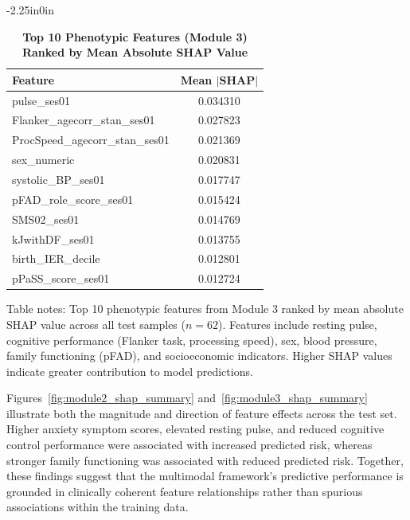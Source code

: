 \documentclass[10pt,letterpaper]{article}
\newcommand{\hlpar}[1]{\leavevmode\colorbox{yellow!30}{\parbox{\dimexpr\linewidth-2\fboxsep\relax}{#1}}\vspace{2pt}}
\begin{document}
\begin{table}[!t]
\begin{adjustwidth}{-2.25in}{0in}
\centering
\caption{\textbf{Top 10 Phenotypic Features (Module 3) Ranked by Mean Absolute SHAP Value}}
\label{tab:module3_shap}
\footnotesize
\renewcommand{\arraystretch}{1.3}

\begin{tabular}{|l|c|}
\hline
\textbf{Feature} & \textbf{Mean $|$SHAP$|$} \\
\hline
pulse\_ses01 & 0.034310 \\
\hline
Flanker\_agecorr\_stan\_ses01 & 0.027823 \\
\hline
ProcSpeed\_agecorr\_stan\_ses01 & 0.021369 \\
\hline
sex\_numeric & 0.020831 \\
\hline
systolic\_BP\_ses01 & 0.017747 \\
\hline
pFAD\_role\_score\_ses01 & 0.015424 \\
\hline
SMS02\_ses01 & 0.014769 \\
\hline
kJwithDF\_ses01 & 0.013755 \\
\hline
birth\_IER\_decile & 0.012801 \\
\hline
pPaSS\_score\_ses01 & 0.012724 \\
\hline
\end{tabular}

\begin{flushleft}
Table notes: Top 10 phenotypic features from Module 3 ranked by mean absolute SHAP value across all test samples ($n=62$). Features include resting pulse, cognitive performance (Flanker task, processing speed), sex, blood pressure, family functioning (pFAD), and socioeconomic indicators. Higher SHAP values indicate greater contribution to model predictions.
\end{flushleft}
\end{adjustwidth}
\end{table}

\hlpar{Figures~\ref{fig:module2_shap_summary} and~\ref{fig:module3_shap_summary} illustrate both the magnitude and direction of feature effects across the test set. Higher anxiety symptom scores, elevated resting pulse, and reduced cognitive control performance were associated with increased predicted risk, whereas stronger family functioning was associated with reduced predicted risk. Together, these findings suggest that the multimodal framework's predictive performance is grounded in clinically coherent feature relationships rather than spurious associations within the training data.}
\end{document}
